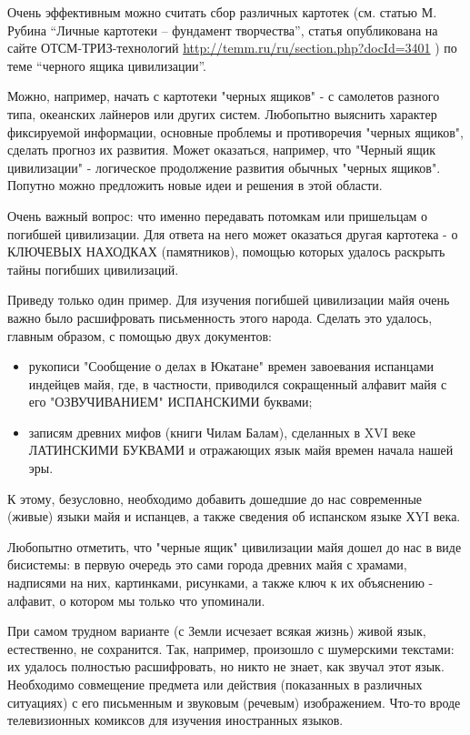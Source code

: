 \documentclass[11pt,a4paper]{article}
\begin{document}
Очень эффективным можно считать сбор различных картотек (см. статью М. Рубина
“Личные картотеки – фундамент творчества”, статья опубликована на сайте
ОТСМ-ТРИЗ-технологий \url{http://temm.ru/ru/section.php?docId=3401} ) по теме
“черного ящика цивилизации”.

Можно, например, начать с картотеки "черных ящиков" - с самолетов разного
типа, океанских лайнеров или других систем. Любопытно выяснить характер
фиксируемой информации, основные проблемы и противоречия "черных ящиков",
сделать прогноз их развития. Может оказаться, например, что "Черный ящик
цивилизации" - логическое продолжение развития обычных "черных
ящиков". Попутно можно предложить новые идеи и решения в этой области.

Очень важный вопрос: что именно передавать потомкам или пришельцам о погибшей
цивилизации. Для ответа на него может оказаться другая картотека - о КЛЮЧЕВЫХ
НАХОДКАХ (памятников), помощью которых удалось раскрыть тайны погибших
цивилизаций.
\medskip

Приведу только один пример. Для изучения погибшей цивилизации майя очень важно было расшифровать письменность этого народа. Сделать это удалось, главным образом, с помощью двух документов:
\begin{itemize}
\item рукописи "Сообщение о делах в Юкатане" времен завоевания испанцами
  индейцев майя, где, в частности, приводился сокращенный алфавит майя с его
  "ОЗВУЧИВАНИЕМ" ИСПАНСКИМИ буквами;
\item записям древних мифов (книги Чилам Балам), сделанных в XVI веке
  ЛАТИНСКИМИ БУКВАМИ и отражающих язык майя времен начала нашей эры.
\end{itemize}
К этому, безусловно, необходимо добавить дошедшие до нас современные (живые)
языки майя и испанцев, а также сведения об испанском языке ХYI века.

Любопытно отметить, что "черные ящик" цивилизации майя дошел до нас в виде
бисистемы: в первую очередь это сами города древних майя с храмами, надписями
на них, картинками, рисунками, а также ключ к их объяснению - алфавит, о
котором мы только что упоминали.
\medskip

При самом трудном варианте (с Земли исчезает всякая жизнь) живой язык,
естественно, не сохранится. Так, например, произошло с шумерскими текстами: их
удалось полностью расшифровать, но никто не знает, как звучал этот
язык. Необходимо совмещение предмета или действия (показанных в различных
ситуациях) с его письменным и звуковым (речевым) изображением. Что-то вроде
телевизионных комиксов для изучения иностранных языков.
\end{document}
